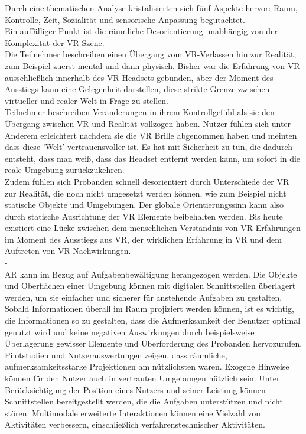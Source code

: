 Durch eine thematischen Analyse kristalisierten sich fünf Aspekte hervor: Raum, Kontrolle, Zeit, Sozialität und sensorische Anpassung begutachtet.\\
Ein auffälliger Punkt ist die räumliche Desorientierung unabhängig von der Komplexität der VR-Szene.\\ 
 Die Teilnehmer beschreiben einen Übergang vom VR-Verlassen hin zur Realität, zum Beispiel zuerst mental und dann physisch.
Bisher war die Erfahrung von VR ausschließlich innerhalb des VR-Headsets gebunden, aber der Moment des Ausstiegs kann eine Gelegenheit darstellen, diese strikte Grenze zwischen virtueller und realer Welt in Frage zu stellen.\\
Teilnehmer beschreiben Veränderungen in ihrem Kontrollgefühl als sie den Übergang zwischen VR und Realität vollzogen haben. Nutzer fühlen sich unter Anderem erleichtert nachdem sie die VR Brille abgenommen haben und meinten dass diese 'Welt' vertrauensvoller ist. Es hat mit Sicherheit zu tun, die dadurch entsteht, dass man weiß, dass das Headset entfernt werden kann, um sofort in die reale Umgebung zurückzukehren.\\
Zudem fühlen sich Probanden schnell desorientiert durch Unterschiede der VR zur Realität, die noch nicht umgesetzt werden können, wie zum Beispiel nicht statische Objekte und Umgebungen. Der globale Orientierungssinn kann also durch statische Ausrichtung der VR Elemente beibehalten werden.
Bis heute existiert eine Lücke zwischen dem menschlichen Verständnis von VR-Erfahrungen im Moment des Ausstiegs aus VR, der wirklichen Erfahrung in VR und dem Auftreten von VR-Nachwirkungen. \cite{knibbe2018dream}\\


-\cite{bonanni2005attention}\\
AR kann im Bezug auf Aufgabenbewältigung herangezogen werden. 
Die Objekte und Oberflächen einer Umgebung können mit digitalen Schnittstellen überlagert werden, um sie einfacher und sicherer für anstehende Aufgaben zu gestalten. Sobald Informationen überall im Raum projiziert werden können, ist es wichtig, die Informationen so zu gestalten, dass die Aufmerksamkeit der Benutzer optimal genutzt wird und keine negativen Auswirkungen durch beispielsweise Überlagerung gewisser Elemente und Überforderung des Probanden hervozurufen. Pilotstudien und Nutzerauswertungen zeigen, dass räumliche, aufmerksamkeitsstarke Projektionen am nützlichsten waren. Exogene Hinweise können für den Nutzer auch in vertrauten Umgebungen nützlich sein. Unter Berücksichtigung der Position eines Nutzers und seiner Leistung können Schnittstellen bereitgestellt werden, die die Aufgaben unterstützen und nicht stören. Multimodale erweiterte Interaktionen können eine Vielzahl von Aktivitäten verbessern, einschließlich verfahrenstechnischer Aktivitäten.\\

